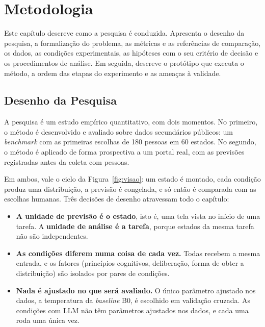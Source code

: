 \documentclass[12pt,oneside,a4paper,chapter=TITLE,english,brazil]{abntex2}
\begin{document}
\chapter{Metodologia}
\label{cap:metodologia}

Este capítulo descreve como a pesquisa é conduzida. Apresenta o desenho da pesquisa, a formalização do problema, as métricas e as referências de comparação, os dados, as condições experimentais, as hipóteses com o seu critério de decisão e os procedimentos de análise. Em seguida, descreve o protótipo que executa o método, a ordem das etapas do experimento e as ameaças à validade.

\section{Desenho da Pesquisa}
\label{sec:desenho}

A pesquisa é um estudo empírico quantitativo, com dois momentos. No primeiro, o método é desenvolvido e avaliado sobre dados secundários públicos: um \textit{benchmark} com as primeiras escolhas de 180 pessoas em 60 estados. No segundo, o método é aplicado de forma prospectiva a um portal real, com as previsões registradas antes da coleta com pessoas.

Em ambos, vale o ciclo da Figura~\ref{fig:visao}: um estado é montado, cada condição produz uma distribuição, a previsão é congelada, e só então é comparada com as escolhas humanas. Três decisões de desenho atravessam todo o capítulo:

\begin{itemize}
\item \textbf{A unidade de previsão é o estado}, isto é, uma tela vista no início de uma tarefa. A \textbf{unidade de análise é a tarefa}, porque estados da mesma tarefa não são independentes.
\item \textbf{As condições diferem numa coisa de cada vez.} Todas recebem a mesma entrada, e os fatores (princípios cognitivos, deliberação, forma de obter a distribuição) são isolados por pares de condições.
\item \textbf{Nada é ajustado no que será avaliado.} O único parâmetro ajustado nos dados, a temperatura da \textit{baseline} B0, é escolhido em validação cruzada. As condições com LLM não têm parâmetros ajustados nos dados, e cada uma roda uma única vez.
\end{itemize}
\end{document}
